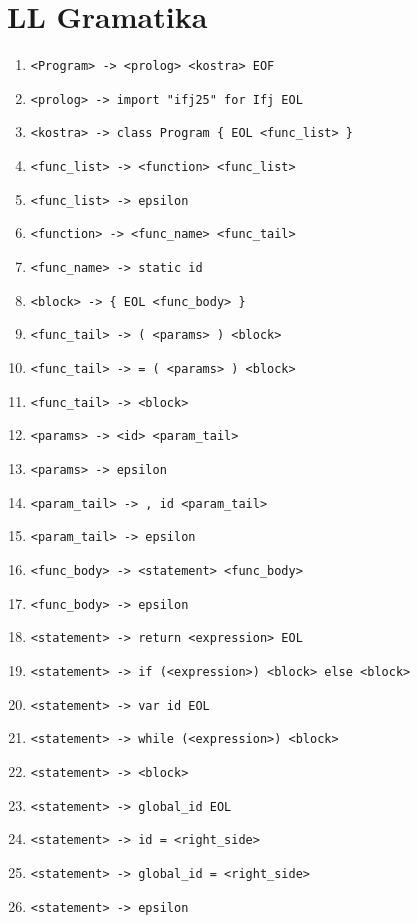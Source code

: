 \section{LL Gramatika}

\begin{enumerate}
    \item \verb|<Program> -> <prolog> <kostra> EOF|
    \item \verb|<prolog> -> import "ifj25" for Ifj EOL|
    \item \verb|<kostra> -> class Program { EOL <func_list> }|
    \item \verb|<func_list> -> <function> <func_list>|
    \item \verb|<func_list> -> epsilon|
    \item \verb|<function> -> <func_name> <func_tail>|
    \item \verb|<func_name> -> static id |
    \item \verb|<block> -> { EOL <func_body> }|
    \item \verb|<func_tail> -> ( <params> ) <block>|
    \item \verb|<func_tail> -> = ( <params> ) <block>|
    \item \verb|<func_tail> -> <block>|
    \item \verb|<params> -> <id> <param_tail>|
    \item \verb|<params> -> epsilon|
    \item \verb|<param_tail> -> , id <param_tail>|
    \item \verb|<param_tail> -> epsilon|
    \item \verb|<func_body> -> <statement> <func_body>|
    \item \verb|<func_body> -> epsilon|
    \item \verb|<statement> -> return <expression> EOL|
    \item \verb|<statement> -> if (<expression>) <block> else <block>|
    \item \verb|<statement> -> var id EOL|
    \item \verb|<statement> -> while (<expression>) <block>|
    \item \verb|<statement> -> <block>|
    \item \verb|<statement> -> global_id EOL|
    \item \verb|<statement> -> id = <right_side>|
    \item \verb|<statement> -> global_id = <right_side>|
    \item \verb|<statement> -> epsilon|

\end{enumerate}
